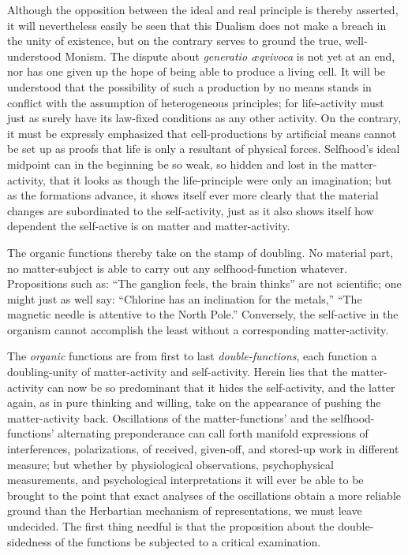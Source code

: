 \documentclass[12pt]{article}
\begin{document}
Although the opposition between the ideal and real principle is thereby
asserted, it will nevertheless easily be seen that this Dualism does not make
a breach in the unity of existence, but on the contrary
serves to ground the true, well-understood Monism. The dispute about
\textit{generatio æqvivoca} is not yet at an end, nor has one given up the
hope of being able to produce a living cell. It will be understood that the
possibility of such a production by no means stands in conflict with the
assumption of heterogeneous principles; for life-activity must just as surely
have its law-fixed conditions as any other activity. On the contrary, it must
be expressly emphasized that cell-productions by artificial means cannot be
set up as proofs that life is only a resultant of physical forces.
Selfhood's ideal midpoint can in the beginning be so weak, so hidden and lost
in the matter-activity, that it looks as though the life-principle were only
an imagination; but as the formations advance, it shows itself ever more
clearly that the material changes are subordinated to the self-activity, just
as it also shows itself how dependent the self-active is on matter and
matter-activity.

The organic functions thereby take on the stamp of doubling. No material
part, no matter-subject is able to carry out any selfhood-function whatever.
Propositions such as: ``The ganglion feels, the brain thinks'' are not
scientific; one might just as well say: ``Chlorine has an inclination for the
metals,'' ``The magnetic needle is attentive to the North Pole.'' Conversely,
the self-active in the organism cannot accomplish the least without a
corresponding matter-activity.

The \emph{organic} functions are from first to last \emph{double-functions},
each function a doubling-unity of matter-activity and self-activity. Herein
lies that the matter-activity can now be so predominant that it hides the
self-activity, and the latter again, as in pure thinking and willing, take on
the appearance of pushing the matter-activity back. Oscillations of the
matter-functions' and the selfhood-functions' alternating preponderance can
call forth manifold expressions of interferences, polarizations, of received,
given-off, and stored-up work in different measure; but whether by
physiological observations, psychophysical measurements, and psychological
interpretations it will ever
be able to be brought to the point that exact analyses of the oscillations
obtain a more reliable ground than the Herbartian mechanism of
representations, we must leave undecided. The first thing needful is that the
proposition about the double-sidedness of the functions be subjected to a
critical examination.
\end{document}

